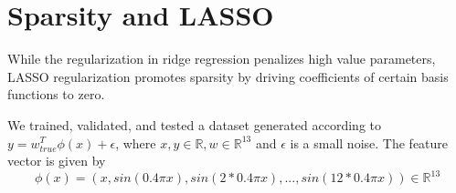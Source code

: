 \documentclass[10pt, twocolumn]{article}
\newcommand{\R}{\mathbb{R}}
\begin{document}






\section{Sparsity and LASSO}

While the regularization in ridge regression penalizes high value parameters, LASSO regularization promotes sparsity by driving coefficients of certain basis functions to zero.

We trained, validated, and tested a dataset generated according to $y=w_{true}^T\phi(x) + \epsilon$, where $x,y \in \R, w \in \R^{13}$ and $\epsilon$ is a small noise. The feature vector is given by
$$ \phi(x) = (x, sin(0.4\pi x), sin(2*0.4\pi x),...,sin(12*0.4\pi x)) \in \R^{13}$$
\end{document}
